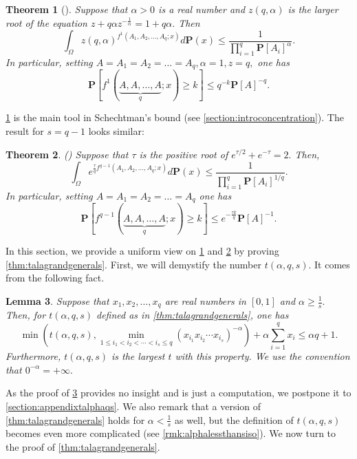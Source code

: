 \documentclass[11pt]{article}\usepackage{amsfonts}
\newtheorem{theorem}{Theorem}
\newtheorem{lemma}[theorem]{Lemma}
\numberwithin{theorem}{subsection}
\newcommand{\prob}{\mathbf{P}}
\begin{document}
\begin{theorem}[{\cite[Section 3.2]{Talagrand01}}]
\label{thm:talagrands1} Suppose that $\alpha>0$ is a real number and $z(q,\alpha)$ is the larger root of the equation $z+q\alpha z^{-\frac{1}{\alpha}} = 1+q\alpha.$
Then
$$
\int_{\Omega}
z(q,\alpha)^{f^1(A_1, A_2, \ldots, A_q; x)}d\prob(x)\le 
\frac{1}{\prod_{i=1}^q \prob[A_i]^\alpha}.
$$
In particular, setting $A= A_1 = A_2= \ldots = A_q, \alpha = 1, z= q,$ one has
$$\prob[f^1(\underbrace{A, A, \ldots, A}_{q}; x)\ge k]\le 
q^{-k}\prob[A]^{-q}.$$
\end{theorem}

\noindent
\cref{thm:talagrands1} is the main tool in Schechtman's bound (see \cref{section:introconcentration}).
The result for $s = q-1$ looks similar:

\begin{theorem}
\label{thm:talagrandsq1}
(\cite[Theorem 5.4]{Talagrand96}) Suppose that $\tau$ is the positive root of $e^{\tau/2} +e^{-\tau} = 2.$ Then,
$$
\int_{\Omega}
e^{\frac{\tau}{q}f^{q-1}(A_1, A_2, \ldots, A_q; x)}d\prob(x)\le 
\frac{1}{\prod_{i=1}^q \prob[A_i]^{1/q}}.
$$
In particular, setting $A= A_1 = A_2= \ldots = A_q$ one has
$$\prob[f^{q-1}(\underbrace{A, A, \ldots, A}_{q}; x)\ge k]\le 
e^{-\frac{\tau k}{q}}\prob[A]^{-1}.$$
\end{theorem}

\noindent
In this section, we provide a uniform view on 
\cref{thm:talagrands1} and \cref{thm:talagrandsq1} by proving \cref{thm:talagrandgenerals}.
First, we will demystify the number $t(\alpha, q, s).$ It comes from the following fact.

\begin{lemma}
\label{lemma:talphaqs}
Suppose that $x_1, x_2, \ldots, x_q$ are real numbers in $[0,1]$ and $\alpha \ge \frac{1}{s}.$ Then, for $t(\alpha,q,s)$ defined as in \cref{thm:talagrandgenerals}, one has
$$
\min \left(
t(\alpha, q, s),
\min_{1\le i_1<i_2<\cdots <i_s\le q}
(x_{i_1}x_{i_2}\cdots x_{i_s})^{-\alpha}
\right)
+ \alpha \sum_{i = 1}^q x_i \le 
\alpha q + 1.
$$
Furthermore, $t(\alpha,q,s)$ is the largest $t$ with this property. We use the convention that $0^{-\alpha}  = +\infty.$
\end{lemma}

\noindent
As the proof of \cref{lemma:talphaqs} provides no insight and is just a computation, we postpone it to \cref{section:appendixtalphaqs}.
We also remark that a version of \cref{thm:talagrandgenerals} holds for $\alpha <\frac{1}{s}$ as well, but the definition of $t(\alpha,q,s)$ becomes even more complicated (see \cref{rmk:alphalessthansiso}).
We now turn to the proof of \cref{thm:talagrandgenerals}.
\end{document}
